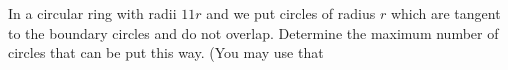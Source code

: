 In a circular ring with radii $11r$ and  we put circles of radius $r$ which are tangent to the boundary circles and do not overlap. Determine the maximum number of circles that can be put this way. (You may use that 